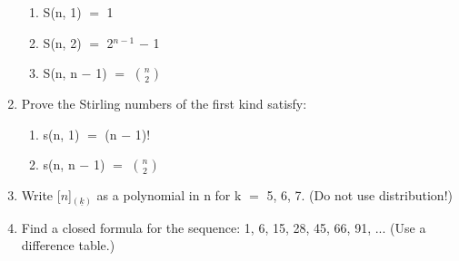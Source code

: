 \documentclass{article}
\newcommand{\mt}[1]{\ensuremath{#1}}
\newcommand{\balist}{\begin{enumerate}[label=\alph*.]}
\newcommand{\elist}{\end{enumerate}}
\newcommand{\ms}{\mt{-} }
\newcommand{\eql}{\mt{=} }
\newcommand{\uf}[2]{#1\mt{^{#2}}}
\newcommand{\nck}[2]{\mt{{#1 \choose #2}}}
\newcommand{\ff}[2]{[\mt{#1}]\mt{_{(\underline{#2})}}}
\begin{document}
\begin{enumerate}
   \balist
   \item S(n, 1) \eql 1
   \item S(n, 2) \eql \uf{2}{n - 1} \ms 1
   \item S(n, n \ms 1) \eql \nck{n}{2}
   \elist
   \item Prove the Stirling numbers of the first kind satisfy:
   \balist
   \item s(n, 1) \eql (n \ms 1)!
   \item s(n, n \ms 1) \eql \nck{n}{2}
   \elist
   \item Write \ff{n}{k} as a polynomial in n for k \eql 5, 6, 7. (Do not use distribution!)
   \item Find a closed formula for the sequence: 1, 6, 15, 28, 45, 66, 91, ... (Use a difference table.)
\end{enumerate}
\end{document}
